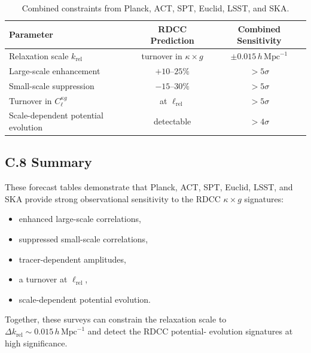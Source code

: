 \documentclass[11pt,a4paper]{article}
\begin{document}
\begin{table}[H]
\centering
\begin{tabular}{lcc}
\hline
\textbf{Parameter} & \textbf{RDCC Prediction} & \textbf{Combined Sensitivity} \\
\hline
Relaxation scale $k_{\mathrm{rel}}$ & turnover in $\kappa \times g$ & $\pm 0.015\,h\,\mathrm{Mpc}^{-1}$ \\
Large-scale enhancement & $+10$--$25\%$ & $>5\sigma$ \\
Small-scale suppression & $-15$--$30\%$ & $>5\sigma$ \\
Turnover in $C_{\ell}^{\kappa g}$ & at $\ell_{\mathrm{rel}}$ & $>5\sigma$ \\
Scale-dependent potential evolution & detectable & $>4\sigma$ \\
\hline
\end{tabular}
\caption{Combined constraints from Planck, ACT, SPT, Euclid, LSST, and SKA.}
\end{table}

\subsection*{C.8 Summary}

These forecast tables demonstrate that Planck, ACT, SPT, Euclid, LSST, and SKA provide 
strong observational sensitivity to the RDCC $\kappa \times g$ signatures:

\begin{itemize}
    \item enhanced large-scale correlations,
    \item suppressed small-scale correlations,
    \item tracer-dependent amplitudes,
    \item a turnover at $\ell_{\mathrm{rel}}$,
    \item scale-dependent potential evolution.
\end{itemize}

Together, these surveys can constrain the relaxation scale to 
$\Delta k_{\mathrm{rel}} \sim 0.015\,h\,\mathrm{Mpc}^{-1}$ and detect the RDCC potential-
evolution signatures at high significance.


\nocite{*}

\end{document}
